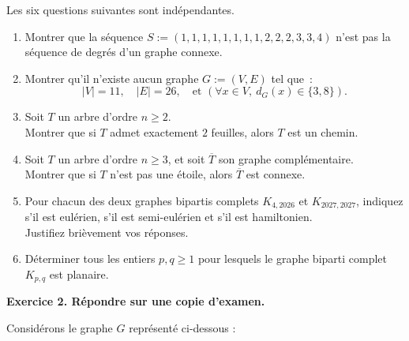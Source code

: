 \documentclass[10pt]{article}
\begin{document}
Les six questions suivantes sont ind\'{e}pendantes.
\begin{enumerate}
\item Montrer que la séquence $S:=(1,1,1,1,1,1,1,1,2,2,2,3,3,4)$ n'est pas la séquence de degrés d'un graphe connexe.

\item Montrer qu'il n'existe aucun graphe $G:=(V,E)$ tel que~:
$$|V|=11, \quad |E|=26, \quad \text{et } (\forall x \in V, \ d_G(x) \in \{3,8\}).$$

\item Soit $T$ un arbre d'ordre $n \geq 2$.\\
Montrer que si $T$ admet exactement $2$ feuilles, alors $T$ est un chemin.

\item Soit $T$ un arbre d'ordre $n \geq 3$, et soit $\overline{T}$ son graphe complémentaire.\\
Montrer que si $T$ n'est pas une étoile, alors $\overline{T}$ est connexe.

\item Pour chacun des deux graphes bipartis complets $K_{4,2026}$  et $K_{2027,2027}$, indiquez s'il est eulérien, s'il est semi-eulérien et s'il est hamiltonien. \\
    Justifiez brièvement vos réponses.

\item Déterminer tous les entiers $p, q \geq 1$ pour lesquels le graphe biparti complet $K_{p,q}$ est planaire.
\end{enumerate}

\newpage
\noindent \textbf{Exercice 2. Répondre sur une copie d'examen.}

Considérons le graphe $G$ représenté ci-dessous :

\begin{center}
\end{center}
\end{document}

